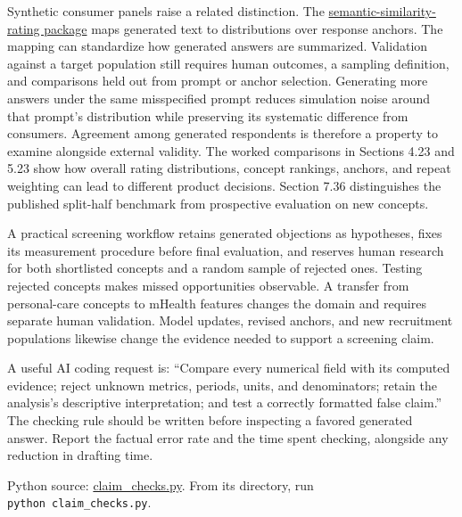 Synthetic consumer panels raise a related distinction. The
\href{https://github.com/pymc-labs/semantic-similarity-rating}{semantic-similarity-rating
package} maps generated text to distributions over response anchors. The
mapping can standardize how generated answers are summarized. Validation
against a target population still requires human outcomes, a sampling
definition, and comparisons held out from prompt or anchor selection.
Generating more answers under the same misspecified prompt reduces
simulation noise around that prompt's distribution while preserving its
systematic difference from consumers. Agreement among generated
respondents is therefore a property to examine alongside external
validity. The worked comparisons in Sections 4.23 and 5.23 show how
overall rating distributions, concept rankings, anchors, and repeat
weighting can lead to different product decisions. Section 7.36
distinguishes the published split-half benchmark from prospective
evaluation on new concepts.

A practical screening workflow retains generated objections as
hypotheses, fixes its measurement procedure before final evaluation, and
reserves human research for both shortlisted concepts and a random
sample of rejected ones. Testing rejected concepts makes missed
opportunities observable. A transfer from personal-care concepts to
mHealth features changes the domain and requires separate human
validation. Model updates, revised anchors, and new recruitment
populations likewise change the evidence needed to support a screening
claim.

A useful AI coding request is: ``Compare every numerical field with its
computed evidence; reject unknown metrics, periods, units, and
denominators; retain the analysis's descriptive interpretation; and test
a correctly formatted false claim.'' The checking rule should be written
before inspecting a favored generated answer. Report the factual error
rate and the time spent checking, alongside any reduction in drafting
time.

\FloatBarrier
{}
Python source:
\href{../03_Data_and_Code/mHealth/recurring_examples/claim_checks.py}{claim\_checks.py}.
From its directory, run \texttt{python\ claim\_checks.py}.

